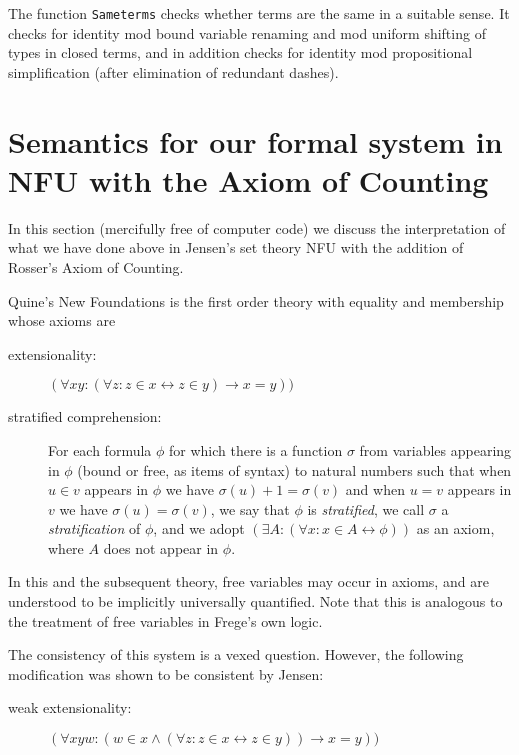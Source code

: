 \documentclass{article}
\begin{document}
{{The function {\tt Sameterms} checks whether terms are the same in a suitable sense.  It checks for identity mod bound variable renaming and mod uniform shifting of types in closed terms,
and in addition checks for identity mod propositional simplification (after elimination of redundant dashes).

\newpage

\section{Semantics for our formal system in NFU with the Axiom of Counting}

In this section (mercifully free of computer code) we discuss the interpretation of what we have done above in Jensen's set theory NFU with the addition of Rosser's Axiom of Counting.

Quine's New Foundations is the first order theory with equality and membership whose axioms are 

\begin{description}

\item[extensionality:]  $(\forall xy:(\forall z:z \in x \leftrightarrow z \in y) \rightarrow x=y))$

\item[stratified comprehension:]  For each formula $\phi$ for which there is a function $\sigma$ from variables appearing in $\phi$ (bound or free, as items of syntax) to natural numbers
such that when $u \in v$ appears in $\phi$ we have $\sigma(u)+1 = \sigma(v)$ and when $u=v$ appears in $v$ we have $\sigma(u)=\sigma(v)$, we say that $\phi$ is {\em stratified\/}, we call $\sigma$ a {\em stratification\/} of $\phi$, and we adopt $(\exists A:(\forall x:x \in A \leftrightarrow \phi))$ as an axiom, where $A$ does not appear in $\phi$.

\end{description}

In this and the subsequent theory, free variables may occur in axioms, and are understood to be implicitly universally quantified.  Note that this is analogous to the treatment of free variables in Frege's own logic.

The consistency of this system is a vexed question.  However, the following modification was shown to be consistent by Jensen:

\begin{description}

\item[weak extensionality:]  $(\forall xyw:(w\in x\wedge  (\forall z:z \in x \leftrightarrow z \in y)) \rightarrow x=y))$


\end{description}}}
\end{document}
